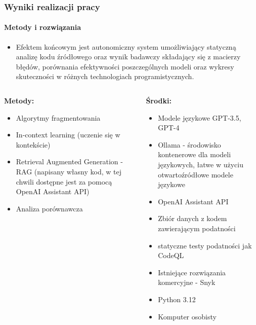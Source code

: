 \documentclass[lualatex,aspectratio=54,12pt,]{beamer}
\begin{document}
\begin{frame}
      \frametitle{Wyniki realizacji pracy}
      \framesubtitle{Metody i rozwiązania}
      \begin{itemize}
        \item Efektem końcowym jest autonomiczny
        system umożliwiający statyczną analizę kodu
        źródłowego oraz wynik badawczy składający
        się z macierzy błędów, porównania
        efektywności poszczególnych modeli oraz
        wykresy skuteczności w różnych
        technologiach programistycznych. 
      \end{itemize}
\begin{columns}
      \scriptsize
        \begin{column}{0.5\textwidth}
          \textbf{Metody:}
          \begin{itemize}
            \item Algorytmy fragmentowania
            \item In-context learning (uczenie się w kontekście)
            \item Retrieval Augmented Generation - RAG (napisany własny kod, w tej chwili dostępne jest za pomocą OpenAI Assistant API)
            \item Analiza porównawcza
          \end{itemize}
        \end{column}
      \begin{column}{0.5\textwidth}
      \textbf{Środki:}
      \begin{itemize}
        \item Modele językowe GPT-3.5, GPT-4
        \item Ollama - środowisko kontenerowe dla modeli językowych, łatwe w użyciu otwartoźródłowe modele językowe
        \item OpenAI Assistant API 
        \item Zbiór danych z kodem zawierającym podatności
        \item statyczne testy podatności jak CodeQL
        \item Istniejące rozwiązania komercyjne - Snyk
        \item Python 3.12
        \item Komputer osobisty
      \end{itemize}
      \end{column}
  \end{columns}
\end{frame}
\end{document}
